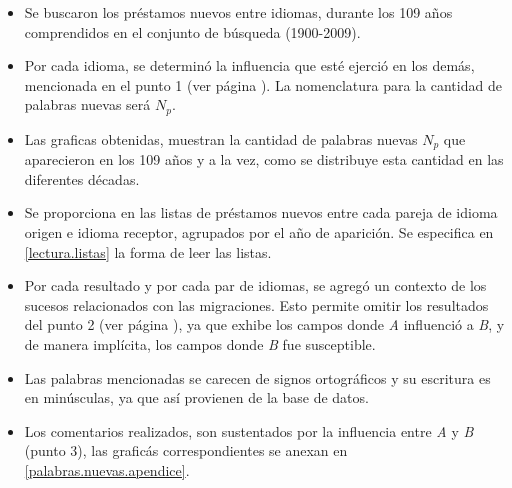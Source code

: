 \begin{itemize}

\item Se buscaron los préstamos nuevos entre idiomas,  durante los 109 años comprendidos en el conjunto de búsqueda (1900-2009).
	
\item Por cada idioma, se determinó la influencia que esté ejerció en los demás, mencionada en el punto 1 (ver página \pageref{proceso.nuevos}). La nomenclatura para la cantidad de palabras nuevas será $N_{p}$.



\item Las graficas obtenidas, muestran la cantidad de palabras nuevas $N_{p}$ que aparecieron en los 109 años y a la vez, como se distribuye esta cantidad en las diferentes décadas. 

\item Se proporciona en \cite{prestamos_nuevos} las listas  de préstamos nuevos entre cada pareja de idioma origen e idioma receptor, agrupados por el año de aparición.  Se especifica en \ref{lectura.listas}  la forma de leer las listas.

\item Por cada resultado y por cada par de idiomas, se agregó un contexto de los sucesos relacionados con las migraciones. Esto permite omitir los resultados del punto 2 (ver  página \pageref{proceso.nuevos}), ya que exhibe los campos donde \textit{A} influenció a  \textit{B}, y de manera implícita, los campos donde \textit{B} fue susceptible.

\item Las palabras mencionadas se carecen de signos ortográficos y su escritura es en minúsculas, ya que así provienen de la base de datos. 

\item Los comentarios realizados, son sustentados por la influencia entre \textit{A} y \textit{B} (punto 3), las graficás correspondientes se anexan en \ref{palabras.nuevas.apendice}. 

\end{itemize}

